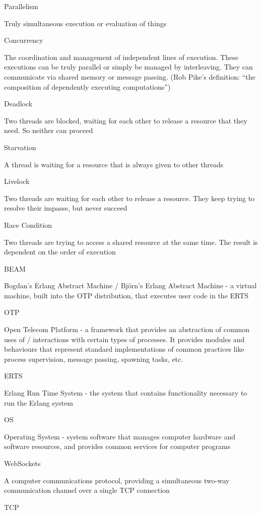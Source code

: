 \documentclass[]{final}
\begin{document}
Parallelism

Truly simultaneous execution or evaluation of things

Concurrency

The coordination and management of independent lines of execution. These executions
can be truly parallel or simply be managed by interleaving. They can communicate
via shared memory or message passing. (Rob Pike's definition: “the composition of
dependently executing computations”)

Deadlock

Two threads are blocked, waiting for each other to release a resource that they need. So neither can proceed

Starvation

A thread is waiting for a resource that is always given to other threads

Livelock

Two threads are waiting for each other to release a resource. They keep trying to resolve their impasse, but never succeed

Race Condition

Two threads are trying to access a shared resource at the same time. The result is dependent on the order of execution

BEAM

Bogdan's Erlang Abstract Machine / Björn's Erlang Abstract Machine - a virtual machine, built into the OTP
distribution, that executes user code in the ERTS

OTP

Open Telecom Platform - a framework that provides an abstraction of common uses of / interactions with
certain types of processes. It provides modules and behaviours that represent standard implementations of
common practices like process supervision, message passing, spawning tasks, etc.

ERTS

Erlang Run Time System - the system that contains functionality necessary to run the Erlang system

OS

Operating System - system software that manages computer hardware and software resources, and
provides common services for computer programs

WebSockets

A computer communications protocol, providing a simultaneous two-way communication channel
over a single TCP connection

TCP
\end{document}
